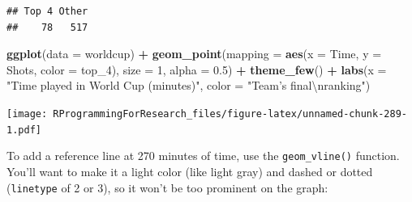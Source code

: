 \documentclass[]{book}
\makeatletter
\newenvironment{Shaded}{\begin{snugshade}}{\end{snugshade}}
\newcommand{\KeywordTok}[1]{\textcolor[rgb]{0.13,0.29,0.53}{\textbf{#1}}}
\newcommand{\DataTypeTok}[1]{\textcolor[rgb]{0.13,0.29,0.53}{#1}}
\newcommand{\DecValTok}[1]{\textcolor[rgb]{0.00,0.00,0.81}{#1}}
\newcommand{\FloatTok}[1]{\textcolor[rgb]{0.00,0.00,0.81}{#1}}
\newcommand{\CharTok}[1]{\textcolor[rgb]{0.31,0.60,0.02}{#1}}
\newcommand{\StringTok}[1]{\textcolor[rgb]{0.31,0.60,0.02}{#1}}
\newcommand{\OtherTok}[1]{\textcolor[rgb]{0.56,0.35,0.01}{#1}}
\newcommand{\OperatorTok}[1]{\textcolor[rgb]{0.81,0.36,0.00}{\textbf{#1}}}
\newcommand{\NormalTok}[1]{#1}
\newenvironment{kframe}{%
\medskip{}
\setlength{\fboxsep}{.8em}
 \def\at@end@of@kframe{}%
 \ifinner\ifhmode%
  \def\at@end@of@kframe{\end{minipage}}%
  \begin{minipage}{\columnwidth}%
 \fi\fi%
 \def\FrameCommand##1{\hskip\@totalleftmargin \hskip-\fboxsep
 \colorbox{shadecolor}{##1}\hskip-\fboxsep
     \hskip-\linewidth \hskip-\@totalleftmargin \hskip\columnwidth}%
 \MakeFramed {\advance\hsize-\width
   \@totalleftmargin\z@ \linewidth\hsize
   \@setminipage}}%
 {\par\unskip\endMakeFramed%
 \at@end@of@kframe}
\renewenvironment{Shaded}{\begin{kframe}}{\end{kframe}}
\theoremstyle{definition}
\theoremstyle{definition}
\theoremstyle{definition}
\theoremstyle{remark}
\makeatother
\begin{document}
\begin{Shaded}
\end{Shaded}

\begin{verbatim}
## Top 4 Other 
##    78   517
\end{verbatim}

\begin{Shaded}
\begin{Highlighting}[]
\KeywordTok{ggplot}\NormalTok{(}\DataTypeTok{data =}\NormalTok{ worldcup) }\OperatorTok{+}
\StringTok{  }\KeywordTok{geom_point}\NormalTok{(}\DataTypeTok{mapping =} \KeywordTok{aes}\NormalTok{(}\DataTypeTok{x =}\NormalTok{ Time, }\DataTypeTok{y =}\NormalTok{ Shots, }\DataTypeTok{color =}\NormalTok{ top_}\DecValTok{4}\NormalTok{),}
             \DataTypeTok{size =} \DecValTok{1}\NormalTok{, }\DataTypeTok{alpha =} \FloatTok{0.5}\NormalTok{) }\OperatorTok{+}\StringTok{ }
\StringTok{  }\KeywordTok{theme_few}\NormalTok{() }\OperatorTok{+}\StringTok{ }
\StringTok{  }\KeywordTok{labs}\NormalTok{(}\DataTypeTok{x =} \StringTok{"Time played in World Cup (minutes)"}\NormalTok{,}
       \DataTypeTok{color =} \StringTok{"Team's final}\CharTok{\textbackslash{}n}\StringTok{ranking"}\NormalTok{)}
\end{Highlighting}
\end{Shaded}

\texttt{[image: RProgrammingForResearch\_files/figure-latex/unnamed-chunk-289-1.pdf]}

To add a reference line at 270 minutes of time, use the
\texttt{geom\_vline()} function. You'll want to make it a light color
(like light gray) and dashed or dotted (\texttt{linetype} of 2 or 3), so
it won't be too prominent on the graph:
\end{document}
